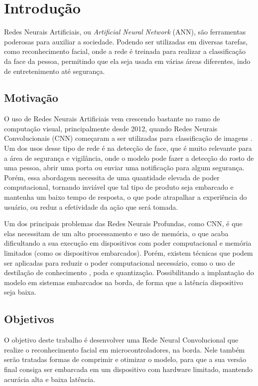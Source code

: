 \chapter{Introdução}

Redes Neurais Artificiais, ou \textit{Artificial Neural Network} (ANN), são ferramentas poderosas para auxiliar a
sociedade.
Podendo ser utilizadas em diversas tarefas, como reconhecimento facial, onde a rede é treinada para realizar a
classificação da face da pessoa, permitindo que ela seja usada em várias áreas diferentes, indo de entretenimento até
segurança.

\section{Motivação}
O uso de Redes Neurais Artificiais vem crescendo bastante no ramo de computação visual, principalmente desde 2012,
quando Redes Neurais Convolucionais (CNN) começaram a ser utilizadas para classificação de imagens \cite{alexnet}.
Um dos usos desse tipo de rede é na detecção de face, que é muito relevante para a área de segurança e
vigilância, onde o modelo pode fazer a detecção do rosto de uma pessoa, abrir uma porta ou enviar uma notificação
para algum segurança.
Porém, essa abordagem necessita de uma quantidade elevada de poder computacional, tornando inviável que tal tipo de
produto seja embarcado e mantenha um baixo tempo de resposta, o que pode atrapalhar a experiência do usuário, ou
reduz a efetividade da ação que será tomada.

Um dos principais problemas das Redes Neurais Profundas, como CNN, é que elas necessitam de um alto processamento e uso
de memória, o que acaba dificultando a sua execução em dispositivos com poder computacional e memória limitados (como os dispositivos embarcados).
Porém, existem técnicas que podem ser aplicadas para reduzir o poder computacional necessário, como o uso de
destilação de conhecimento \cite{hinton2015distilling}, poda e quantização.
Possibilitando a implantação do modelo em sistemas embarcados na borda, de forma que a latência dispositivo seja baixa.

\section{Objetivos}

O objetivo deste trabalho é desenvolver uma Rede Neural Convolucional que realize o reconhecimento facial em
microcontroladores, na borda.
Nele também serão tratadas formas de comprimir e otimizar o modelo, para que a sua versão final consiga ser embarcada
em um dispositivo com hardware limitado, mantendo acurácia alta e baixa latência.

